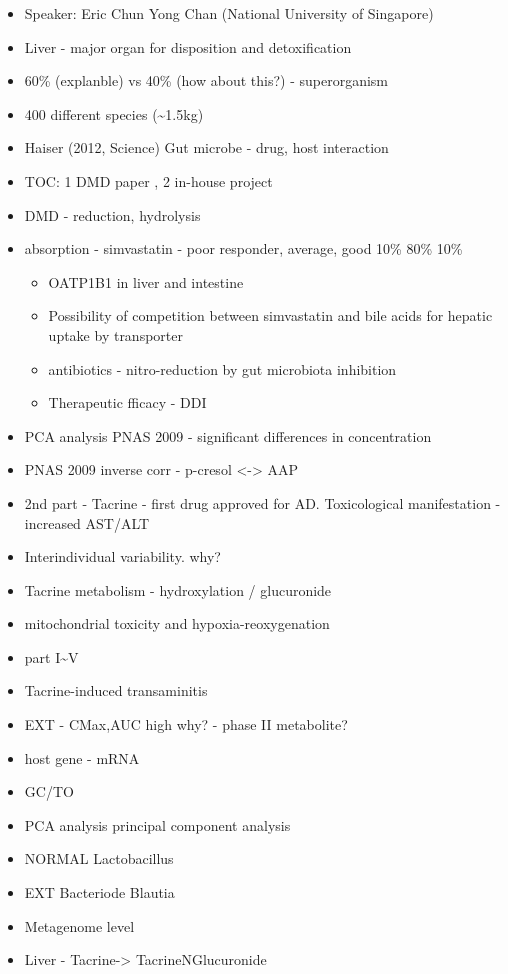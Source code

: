\documentclass[]{book}
\providecommand{\tightlist}{%
  \setlength{\itemsep}{0pt}\setlength{\parskip}{0pt}}
\begin{document}
\begin{itemize}
\tightlist
\item
  Speaker: Eric Chun Yong Chan (National University of Singapore)
\item
  Liver - major organ for disposition and detoxification
\item
  60\% (explanble) vs 40\% (how about this?) - superorganism
\item
  400 different species (\textasciitilde{}1.5kg)
\item
  Haiser (2012, Science) Gut microbe - drug, host interaction
\item
  TOC: 1 DMD paper , 2 in-house project
\item
  DMD - reduction, hydrolysis
\item
  absorption - simvastatin - poor responder, average, good 10\% 80\%
  10\%

  \begin{itemize}
  \tightlist
  \item
    OATP1B1 in liver and intestine
  \item
    Possibility of competition between simvastatin and bile acids for
    hepatic uptake by transporter
  \item
    antibiotics - nitro-reduction by gut microbiota inhibition
  \item
    Therapeutic fficacy - DDI
  \end{itemize}
\item
  PCA analysis PNAS 2009 - significant differences in concentration
\item
  PNAS 2009 inverse corr - p-cresol \textless{}-\textgreater{} AAP
\item
  2nd part - Tacrine - first drug approved for AD. Toxicological
  manifestation - increased AST/ALT
\item
  Interindividual variability. why?
\item
  Tacrine metabolism - hydroxylation / glucuronide
\item
  mitochondrial toxicity and hypoxia-reoxygenation
\item
  part I\textasciitilde{}V
\item
  Tacrine-induced transaminitis
\item
  EXT - CMax,AUC high why? - phase II metabolite?
\item
  host gene - mRNA
\item
  GC/TO
\item
  PCA analysis principal component analysis
\item
  NORMAL Lactobacillus
\item
  EXT Bacteriode Blautia
\item
  Metagenome level
\item
  Liver - Tacrine-\textgreater{} TacrineNGlucuronide
\end{itemize}
\end{document}
